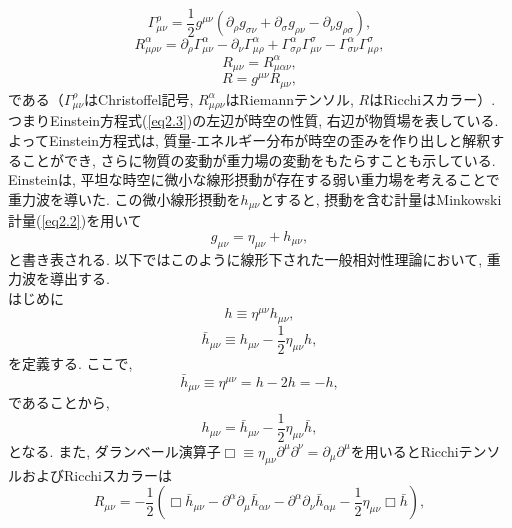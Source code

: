 \begin{equation}
\Gamma^{\rho}_{\mu\nu}=\frac{1}{2}g^{\mu\nu}(\partial_{\rho}g_{\sigma\nu}+\partial_{\sigma}g_{\rho\nu}-\partial_{\nu}g_{\rho\sigma}),
\end{equation}
\begin{equation}
R^{\alpha}_{\mu\rho\nu}=\partial_{\rho}\Gamma^{\alpha}_{\mu\nu}-\partial_{\nu}\Gamma^{\alpha}_{\mu\rho}+\Gamma^{\alpha}_{\sigma\rho}\Gamma^{\sigma}_{\mu\nu}-\Gamma^{\alpha}_{\sigma\nu}\Gamma^{\sigma}_{\mu\rho},
\end{equation}
\begin{equation}
R_{\mu\nu}=R^{\alpha}_{\mu\alpha\nu},
\end{equation}
\begin{equation}
R=g^{\mu\nu}R_{\mu\nu},
\end{equation}
である（$\Gamma^{\rho}_{\mu\nu}$はChristoffel記号, $R^{\alpha}_{\mu\rho\nu}$はRiemannテンソル, $R$はRicchiスカラー）. つまりEinstein方程式(\ref{eq2.3})の左辺が時空の性質, 右辺が物質場を表している. よってEinstein方程式は, 質量-エネルギー分布が時空の歪みを作り出しと解釈することができ, さらに物質の変動が重力場の変動をもたらすことも示している. \\
\quad Einsteinは, 平坦な時空に微小な線形摂動が存在する弱い重力場を考えることで重力波を導いた. この微小線形摂動を$h_{\mu\nu}$とすると, 摂動を含む計量はMinkowski計量(\ref{eq2.2})を用いて
\begin{equation}
g_{\mu\nu}=\eta_{\mu\nu}+h_{\mu\nu},
\end{equation}
と書き表される. 以下ではこのように線形下された一般相対性理論において, 重力波を導出する. \\
はじめに
\begin{equation}
h\equiv\eta^{\mu\nu}h_{\mu\nu},
\end{equation}
\begin{equation}
\bar{h}_{\mu\nu}\equiv h_{\mu\nu}-\frac{1}{2}\eta_{\mu\nu}h,
\end{equation}
を定義する. ここで, 
\begin{equation}
\bar{h}_{\mu\nu}\equiv\eta^{\mu\nu}=h-2h=-h,
\end{equation}
であることから, 
\begin{equation}
h_{\mu\nu}=\bar{h}_{\mu\nu}-\frac{1}{2}\eta_{\mu\nu}\bar{h},
\end{equation}
となる. また, ダランベール演算子$\Box\equiv\eta_{\mu\nu}\partial^{\mu}\partial^{\nu}=\partial_{\mu}\partial^{\mu}$を用いるとRicchiテンソルおよびRicchiスカラーは
\begin{equation}
R_{\mu\nu}=-\frac{1}{2}\left(\Box\bar{h}_{\mu\nu}-\partial^{\alpha}\partial_{\mu}\bar{h}_{\alpha\nu}-\partial^{\alpha}\partial_{\nu}\bar{h}_{\alpha\mu}-\frac{1}{2}\eta_{\mu\nu}\Box\bar{h}\right),
\end{equation}
